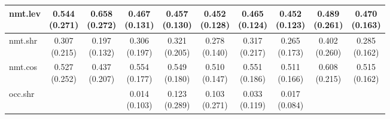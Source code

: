 \documentclass[epsfig,a4paper,11pt,titlepage,twoside,openany]{book}
\begin{document}
\begin{table}[h]
\begin{tabular}{l|c|c|c|c|c|c|c|c|c|}
\multicolumn{1}{|l|}{nmt.lev}            & \makecell{0.544 \\ (0.271)}  & \makecell{0.658 \\ (0.272)} & \makecell{0.467 \\ (0.131)} & \makecell{0.457 \\ (0.130)} & \makecell{0.452 \\ (0.128)} & \makecell{0.465 \\ (0.124)} & \makecell{0.452 \\ (0.123)} & \makecell{0.489 \\ (0.261)}    & \makecell{0.470 \\ (0.163)}   \\ \hline
\multicolumn{1}{|l|}{nmt.shr}                 & \makecell{0.307 \\ (0.215)}  & \makecell{0.197 \\ (0.132)} & \makecell{0.306 \\ (0.197)} & \makecell{0.321 \\ (0.205)} & \makecell{0.278 \\ (0.140)} & \makecell{0.317 \\ (0.217)} & \makecell{0.265 \\ (0.173)} & \makecell{0.402 \\ (0.260)}    & \makecell{0.285 \\ (0.162)}   \\ \hline
\multicolumn{1}{|l|}{nmt.cos} & \makecell{0.527 \\ (0.252)}  & \makecell{0.437 \\ (0.207)} & \makecell{0.554 \\ (0.177)} & \makecell{0.549 \\ (0.180)} & \makecell{0.510 \\ (0.147)} & \makecell{0.551 \\ (0.186)} & \makecell{0.511 \\ (0.166)} & \makecell{0.608 \\ (0.215)}    & \makecell{0.515 \\ (0.162)}   \\ \hline
\multicolumn{1}{|l|}{occ.shr}                  &               &              & \makecell{0.014 \\ (0.103)} & \makecell{0.123 \\ (0.289)} & \makecell{0.103 \\ (0.271)} & \makecell{0.033 \\ (0.119)} & \makecell{0.017 \\ (0.084)} &                 &                \\ \hline

\end{tabular}
\end{table}
\end{document}
